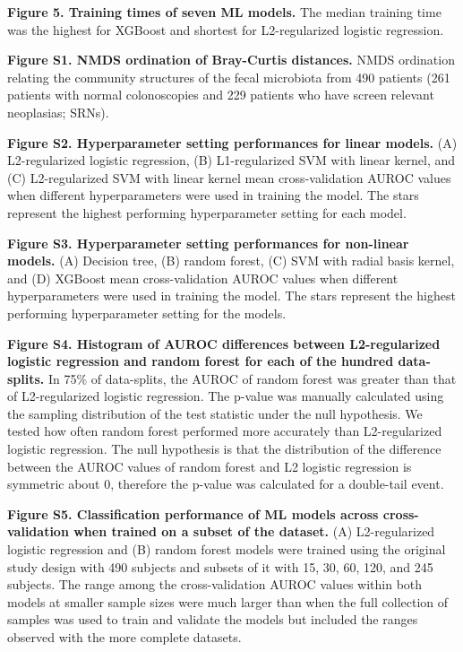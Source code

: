 \documentclass[11pt,]{article}
\begin{document}
\hfill\break

\textbf{Figure 5. Training times of seven ML models.} The median
training time was the highest for XGBoost and shortest for
L2-regularized logistic regression.

\newpage

\textbf{Figure S1. NMDS ordination of Bray-Curtis distances.} NMDS
ordination relating the community structures of the fecal microbiota
from 490 patients (261 patients with normal colonoscopies and 229
patients who have screen relevant neoplasias; SRNs).

\hfill\break

\textbf{Figure S2. Hyperparameter setting performances for linear
models.} (A) L2-regularized logistic regression, (B) L1-regularized SVM
with linear kernel, and (C) L2-regularized SVM with linear kernel mean
cross-validation AUROC values when different hyperparameters were used
in training the model. The stars represent the highest performing
hyperparameter setting for each model.

\hfill\break

\textbf{Figure S3. Hyperparameter setting performances for non-linear
models.} (A) Decision tree, (B) random forest, (C) SVM with radial basis
kernel, and (D) XGBoost mean cross-validation AUROC values when
different hyperparameters were used in training the model. The stars
represent the highest performing hyperparameter setting for the models.

\hfill\break

\textbf{Figure S4. Histogram of AUROC differences between L2-regularized
logistic regression and random forest for each of the hundred
data-splits.} In 75\% of data-splits, the AUROC of random forest was
greater than that of L2-regularized logistic regression. The p-value was
manually calculated using the sampling distribution of the test
statistic under the null hypothesis. We tested how often random forest
performed more accurately than L2-regularized logistic regression. The
null hypothesis is that the distribution of the difference between the
AUROC values of random forest and L2 logistic regression is symmetric
about 0, therefore the p-value was calculated for a double-tail event.

\hfill\break

\textbf{Figure S5. Classification performance of ML models across
cross-validation when trained on a subset of the dataset.} (A)
L2-regularized logistic regression and (B) random forest models were
trained using the original study design with 490 subjects and subsets of
it with 15, 30, 60, 120, and 245 subjects. The range among the
cross-validation AUROC values within both models at smaller sample sizes
were much larger than when the full collection of samples was used to
train and validate the models but included the ranges observed with the
more complete datasets.
\end{document}
